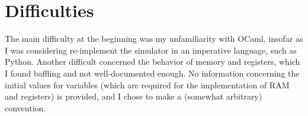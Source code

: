 \documentclass{amsart}
\begin{document}
	\section{Difficulties}
	
	The main difficulty at the beginning was my unfamiliarity with OCaml, insofar as I was considering re-implement the simulator in an imperative language, such as Python. Another difficult concerned the behavior of memory and registers, which I found baffling and not well-documented enough. No information concerning the initial values for variables (which are required for the implementation of RAM and registers) is provided, and I chose to make a (somewhat arbitrary) convention.
	
\end{document}
